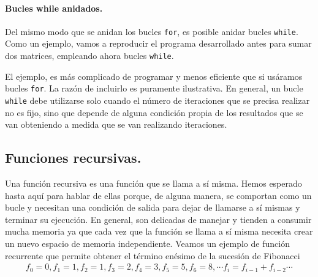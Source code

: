 \paragraph{Bucles while anidados.}  Del mismo modo que se anidan los bucles \texttt{for}, es posible anidar bucles \texttt{while}. Como un ejemplo, vamos a reproducir el programa desarrollado antes para sumar dos matrices, empleando ahora bucles \texttt{while}.



El ejemplo, es más complicado de programar y menos eficiente que si usáramos bucles \texttt{for}. La razón de incluirlo es puramente ilustrativa. En general, un bucle \texttt{while} debe utilizarse solo cuando el número de iteraciones que se precisa realizar no es fijo, sino que depende de alguna condición propia de los resultados que se van obteniendo a medida que se van realizando iteraciones.

\subsection{Funciones recursivas.} 
Una función recursiva es una función que se llama a sí misma. Hemos esperado hasta aquí para hablar de ellas porque, de alguna manera, se comportan como un bucle y necesitan una condición de salida para dejar de llamarse a sí mismas y terminar su ejecución. En general, son delicadas de manejar y tienden a consumir mucha memoria ya que cada vez que la función se llama a sí misma necesita crear un nuevo espacio de memoria independiente. Veamos un ejemplo de función recurrente que permite obtener el término enésimo de la sucesión de Fibonacci  
\begin{align*}
f_0=0, f_1=1, f_2=1, f_3=2, f_4=3, f_5=5, f_6=8, \cdots f_i=f_{i-1}+f_{i-2} \cdots 
\end{align*}

